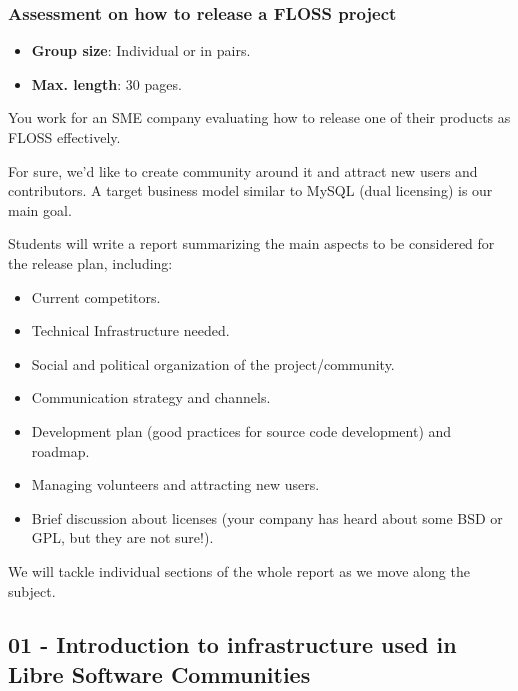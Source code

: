\documentclass[a4paper]{article}
\begin{document}
\subsubsection{Assessment on how to release a FLOSS project}
\label{sub:report-FLOSS-release}

\begin{itemize}
 \item \textbf{Group size}: Individual or in pairs.
 \item \textbf{Max. length}: 30 pages.
\end{itemize}

You work for an SME company evaluating how to release one of their products as FLOSS effectively.

For sure, we'd like to create community around it and attract new users and contributors. A target business model similar to MySQL (dual licensing) is our main goal.

Students will write a report summarizing the main aspects to be considered for the release plan, including:

\begin{itemize}
 \item Current competitors.
 \item Technical Infrastructure needed.
 \item Social and political organization of the project/community.
 \item Communication strategy and channels.
 \item Development plan (good practices for source code development) and roadmap.
 \item Managing volunteers and attracting new users.
 \item Brief discussion about licenses (your company has heard about some BSD or GPL, but they are not sure!).
\end{itemize}

We will tackle individual sections of the whole report as we move along the subject.

\subsection{01 - Introduction to infrastructure used in Libre Software Communities}

\end{document}
